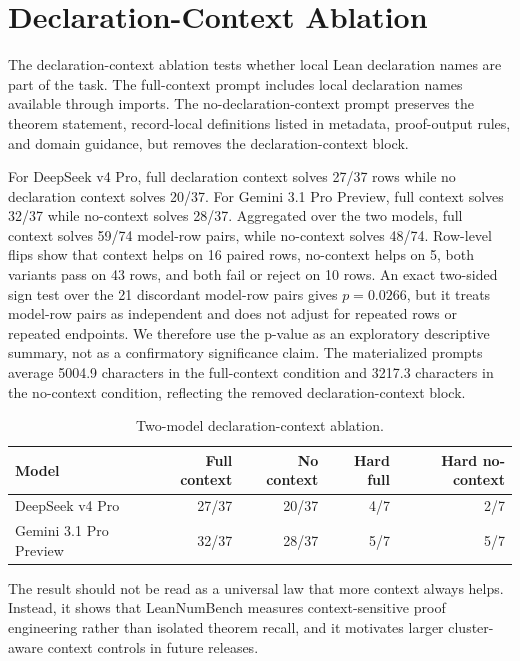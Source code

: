 \section{Declaration-Context Ablation}

The declaration-context ablation tests whether local Lean declaration names are
part of the task. The full-context prompt includes local declaration names
available through imports. The no-declaration-context prompt preserves the
theorem statement, record-local definitions listed in metadata, proof-output
rules, and domain guidance, but removes the declaration-context block.

For DeepSeek v4 Pro, full declaration context solves 27/37 rows while no
declaration context solves 20/37. For Gemini 3.1 Pro Preview, full context
solves 32/37 while no-context solves 28/37. Aggregated over the two models,
full context solves 59/74 model-row pairs, while no-context solves 48/74.
Row-level flips show that context helps on 16 paired rows, no-context helps on
5, both variants pass on 43 rows, and both fail or reject on 10 rows. An
exact two-sided sign test over the 21 discordant model-row pairs gives
\(p=0.0266\), but it treats model-row pairs as independent and does not adjust
for repeated rows or repeated endpoints. We therefore use the p-value as an
exploratory descriptive summary, not as a confirmatory significance claim. The
materialized prompts average 5004.9 characters in the full-context condition
and 3217.3 characters in the no-context condition, reflecting the removed
declaration-context block.

\begin{table}[htbp]
\centering
\caption{Two-model declaration-context ablation.}
\label{tab:supp-context-ablation}
\small
\begin{tabular}{lrrrr}
\toprule
Model & Full context & No context & Hard full & Hard no-context\\
\midrule
DeepSeek v4 Pro & 27/37 & 20/37 & 4/7 & 2/7\\
Gemini 3.1 Pro Preview & 32/37 & 28/37 & 5/7 & 5/7\\
\bottomrule
\end{tabular}
\end{table}

The result should not be read as a universal law that more context always
helps. Instead, it shows that LeanNumBench measures context-sensitive proof
engineering rather than isolated theorem recall, and it motivates larger
cluster-aware context controls in future releases.

